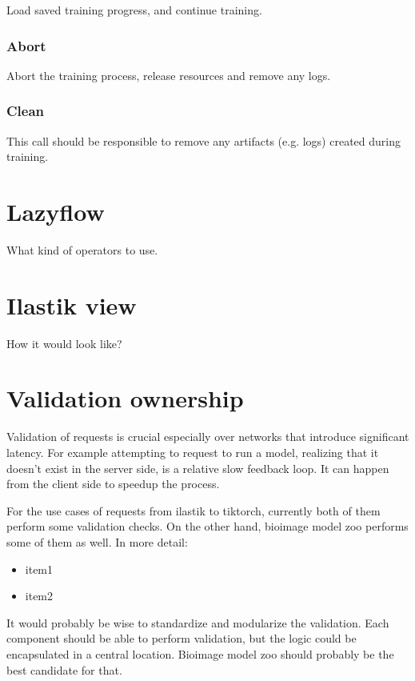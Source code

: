 \documentclass[12pt, a4paper]{article}
\begin{document}
Load saved training progress, and continue training. 

\subsubsection{Abort}

Abort the training process, release resources and remove any logs.

\subsubsection{Clean}

This call should be responsible to remove any artifacts (e.g. logs) created during training.

\section{Lazyflow}

What kind of operators to use.

\section{Ilastik view}

How it would look like?

\section{Validation ownership}
\label{sec:validation}

Validation of requests is crucial especially over networks that introduce significant latency. For example attempting to request to run a model, realizing that it doesn't exist in the server side, is a relative slow feedback loop. It can happen from the client side to speedup the process.

For the use cases of requests from ilastik to tiktorch, currently both of them perform some validation checks. On the other hand, bioimage model zoo performs some of them as well. In more detail:

\begin{itemize}
    \itemsep -0.2em
    \item item1
    \item item2
\end{itemize}


It would probably be wise to standardize and modularize the validation. Each component should be able to perform validation, but the logic could be encapsulated in a central location. Bioimage model zoo should probably be the best candidate for that. 
\end{document}
